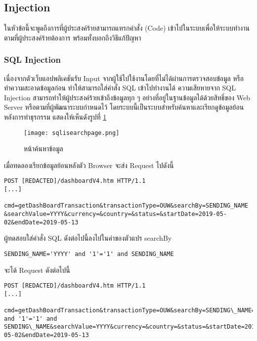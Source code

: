 \subsection{Injection}

ในหัวข้อนี้จะพูดถึงการที่ผู้ประสงค์ร้ายสามารถแทรกคำสั่ง (Code) เข้าไปในระบบเพื่อให้ระบบทำงานตามที่ผู้ประสงค์ร้ายต้องการ พร้อมทั้งบอกถึงวิธีแก้ปัญหา

\subsubsection{SQL Injection}

เนื่องจากตัวเว็บแอปพลิเคชันรับ Input จากผู้ใช้ไปใช้งานโดยที่ไม่ได้ผ่านการตรวจสอบข้อมูล หรือทำความสะอาดข้อมูลก่อน ทำให้สามารถใส่คำสั่ง SQL เข้าไปทำงานได้ ความเสียหายจาก SQL Injection สามารถทำให้ผู้ประสงค์ร้ายเข้าถึงข้อมูลทุก ๆ อย่างที่อยู่ในฐานข้อมูลได้ด้วยสิทธิ์ของ Web Server หรือตามที่ผู้พัฒนาระบบกำหนดไว้ โดยระบบนี้เป็นระบบสำหรับค้นหาและเรียกดูข้อมูลย้อนหลังการทำธุรกรรม แสดงให้เห็นดังรูปที่ \ref{Fig:sqlisearchpage.png}

\begin{figure}[h]
	\centering
	\texttt{[image: sqlisearchpage.png]}
	\caption{หน้าค้นหาข้อมูล}
	\label{Fig:sqlisearchpage.png}
\end{figure}

เมื่อทดลองเรียกข้อมูลย้อนหลังตัว Browser จะส่ง Request ไปดังนี้

\begin{lstlisting}[numbers=none] 
POST [REDACTED]/dashboardV4.htm HTTP/1.1
[...]

cmd=getDashBoardTransaction&transactionType=OUW&searchBy=SENDING_NAME &searchValue=YYYY&currency=&country=&status=&startDate=2019-05-02&endDate=2019-05-13
\end{lstlisting}

ผู้ทดสอบใส่คำสั่ง SQL ดังต่อไปนี้ลงไปในค่าของตัวแปร searchBy

\begin{lstlisting}[numbers=none] 
SENDING_NAME='YYYY' and '1'='1' and SENDING_NAME
\end{lstlisting}

จะได้ Request ดังต่อไปนี้

\begin{lstlisting}[numbers=none] 
POST [REDACTED]/dashboardV4.htm HTTP/1.1
[...]

cmd=getDashBoardTransaction&transactionType=OUW&searchBy=SENDING\_NAME='YYYY' and '1'='1' and SENDING\_NAME&searchValue=YYYY&currency=&country=&status=&startDate=2019-05-02&endDate=2019-05-13
\end{lstlisting}

